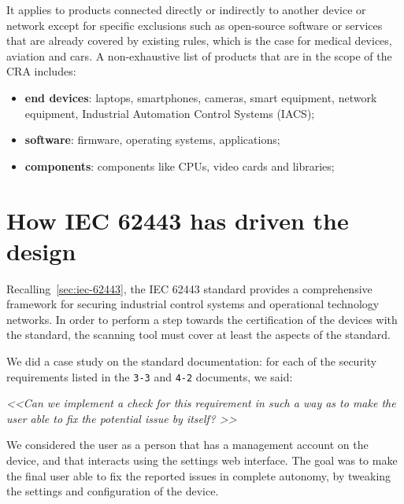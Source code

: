 It applies to products connected directly or indirectly to another device or network except for specific exclusions such as open-source software or services that are already covered by existing rules, which is the case for medical devices, aviation and cars. A non-exhaustive list of products that are in the scope of the CRA includes:~\cite{cra-overview}
\begin{itemize}
  \item \textbf{end devices}: laptops, smartphones, cameras, smart equipment, network equipment, Industrial Automation Control Systems (IACS);
  \item \textbf{software}: firmware, operating systems, applications;
  \item \textbf{components}: components like CPUs, video cards and libraries;
\end{itemize}


\section{How IEC 62443 has driven the design}
\label{sec:iec-62443-driven-design}

Recalling~\cref{sec:iec-62443}, the IEC 62443 standard provides a comprehensive framework for securing industrial control systems and operational technology networks. In order to perform a step towards the certification of the devices with the standard, the scanning tool must cover at least the aspects of the standard.

We did a case study on the standard documentation: for each of the security requirements listed in the \texttt{3-3} and \texttt{4-2} documents, we said:
\begin{mdframed}
  \textit{\textless\textless  Can we implement a check for this requirement in such a way as to make the user able to fix the potential issue by itself? \textgreater\textgreater}
\end{mdframed}
We considered the user as a person that has a management account on the device, and that interacts using the settings web interface. The goal was to make the final user able to fix the reported issues in complete autonomy, by tweaking the settings and configuration of the device.

